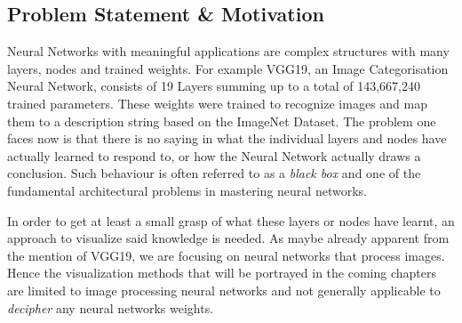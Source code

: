 \subsection{Problem Statement \& Motivation}
\label{sec:problem-statement}
Neural Networks with meaningful applications are complex structures with many layers, nodes and trained weights.
For example VGG19, an Image Categorisation Neural Network, consists of 19 Layers summing up to a total of 143,667,240 trained parameters\cite{vgg}. These weights were trained to recognize images and map them to a description string based on the ImageNet Dataset.
The problem one faces now is that there is no saying in what the individual layers and nodes have actually learned to respond to, or how the Neural Network actually draws a conclusion\cite{castelvecchi2016can}.
Such behaviour is often referred to as a \textit{black box} and one of the fundamental architectural problems in mastering neural networks\cite{olden2002illuminating}.

In order to get at least a small grasp of what these layers or nodes have learnt, an approach to visualize said knowledge is needed.
As maybe already apparent from the mention of VGG19, we are focusing on neural networks that process images.
Hence the visualization methods that will be portrayed in the coming chapters are limited to image processing neural networks and not generally applicable to \textit{decipher} any neural networks weights.

